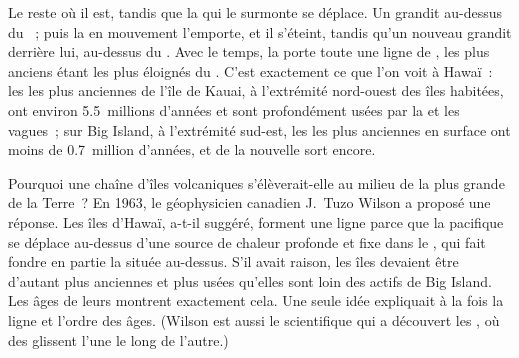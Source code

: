 Le  reste où il est, tandis que la  qui le surmonte se
déplace. Un  grandit au-dessus du ~; puis la  en
mouvement l'emporte, et il s'éteint, tandis qu'un nouveau  grandit
derrière lui, au-dessus du . Avec le temps, la  porte
toute une ligne de , les plus anciens étant les plus éloignés du
. C'est exactement ce que l'on voit à Hawaï~: les  les
plus anciennes de l'île de Kauai, à l'extrémité nord-ouest des îles
habitées, ont environ 5.5~millions d'années et sont profondément usées
par la  et les vagues~; sur Big Island, à l'extrémité sud-est, les
 les plus anciennes en surface ont moins de 0.7~million d'années, et
de la  nouvelle sort encore.

\begin{history}
Pourquoi une chaîne d'îles volcaniques s'élèverait-elle au milieu de la
plus grande  de la Terre~? En 1963, le géophysicien canadien J.~Tuzo
Wilson a proposé une réponse. Les îles d'Hawaï, a-t-il suggéré, forment
une ligne parce que la  pacifique se déplace au-dessus d'une source
de chaleur profonde et fixe dans le , qui fait fondre en partie la
 située au-dessus. S'il avait raison, les îles devaient être d'autant
plus anciennes et plus usées qu'elles sont loin des  actifs de Big
Island. Les âges de leurs  montrent exactement cela. Une seule idée
expliquait à la fois la ligne et l'ordre des âges. (Wilson est aussi le
scientifique qui a découvert les , où des 
glissent l'une le long de l'autre.)
\end{history}

